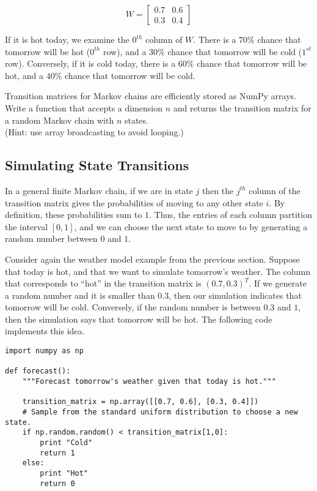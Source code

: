 \[W = \left[\begin{array}{cc}
0.7 & 0.6 \\
0.3 & 0.4 \end{array} \right]\] 


If it is hot today, we examine the $0^{th}$ column of $W$.
There is a $70\%$ chance that tomorrow will be hot ($0^{th}$ row), and a $30\%$ chance that tomorrow will be cold ($1^{st}$ row).
Conversely, if it is cold today, there is a $60\%$ chance that tomorrow will be hot, and a $40\%$ chance that tomorrow will be cold.

\begin{problem} %
Transition matrices for Markov chains are efficiently stored as NumPy arrays.
Write a function that accepts a dimension $n$ and returns the transition matrix for a random Markov chain with $n$ states.
\\
(Hint: use array broadcasting to avoid looping.)
\end{problem}

\subsection*{Simulating State Transitions} %

In a general finite Markov chain, if we are in state $j$ then the $j^{th}$ column of the transition matrix gives the probabilities of moving to any other state $i$.
By definition, these probabilities sum to $1$.
Thus, the entries of each column partition the interval $[0, 1]$, and we can choose the next state to move to by generating a random number between $0$ and $1$.

Consider again the weather model example from the previous section.
Suppose that today is hot, and that we want to simulate tomorrow's weather.
The column that corresponds to ``hot'' in the transition matrix is $(0.7, 0.3)^T$.
If we generate a random number and it is smaller than $0.3$, then our simulation indicates that tomorrow will be cold.
Conversely, if the random number is between $0.3$ and $1$, then the simulation says that tomorrow will be hot.
The following code implements this idea.

\begin{lstlisting}
import numpy as np

def forecast():
	"""Forecast tomorrow's weather given that today is hot."""

	transition_matrix = np.array([[0.7, 0.6], [0.3, 0.4]])
	# Sample from the standard uniform distribution to choose a new state.
	if np.random.random() < transition_matrix[1,0]:
		print "Cold"
		return 1
	else:
		print "Hot"
		return 0
\end{lstlisting}


